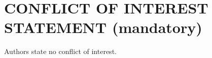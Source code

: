 



\section*{CONFLICT OF INTEREST STATEMENT (mandatory)}
Authors state no conflict of interest.



